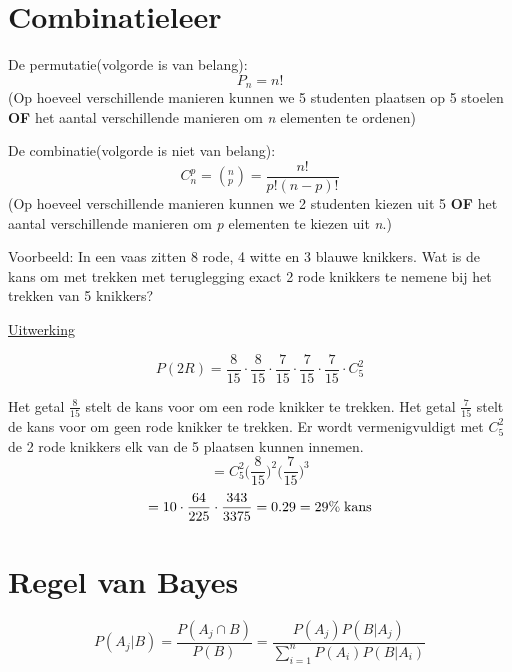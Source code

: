 \documentclass[12pt]{report}
\newcommand{\example}[2]{
      \hrulefill
      
      Voorbeeld: #1
      
      \underline{Uitwerking}
      
      #2
      
      \hrulefill
  }
\begin{document}
\section{Combinatieleer}
De permutatie(volgorde is van belang): $$P_n = n!$$ (Op hoeveel verschillende manieren kunnen we 5 studenten plaatsen op 5 stoelen \textbf{OF} het aantal verschillende manieren om \textit{n} elementen te ordenen)


De combinatie(volgorde is niet van belang): $$C_n^p = (_p^n) = \frac{n!}{p!(n - p)!}$$ (Op hoeveel verschillende manieren kunnen we 2 studenten kiezen uit 5 \textbf{OF} het aantal verschillende manieren om \textit{p} elementen te kiezen uit \textit{n}.)

\example{In een vaas zitten 8 rode, 4 witte en 3 blauwe knikkers. Wat is de kans om met trekken met teruglegging exact 2 rode knikkers te nemene bij het trekken van 5 knikkers?}{
	$$P(2R) = \frac{8}{15} \cdot \frac{8}{15} \cdot \frac{7}{15} \cdot \frac{7}{15} \cdot \frac{7}{15} \cdot C_5^2$$
	
	Het getal $\frac{8}{15}$ stelt de kans voor om een rode knikker te trekken. Het getal $\frac{7}{15}$ stelt de kans voor om geen rode knikker te trekken. Er wordt vermenigvuldigt met $C_5^2$ de 2 rode knikkers elk van de 5 plaatsen kunnen innemen.
	$$=C_5^2 \bigg(\frac{8}{15}\bigg)^2\bigg(\frac{7}{15}\bigg)^3$$
	$$= 10 \cdot \frac{64}{225} \cdot \frac{343}{3375} = 0.29 = 29\%\; \hbox{kans}$$
	
}

\section{Regel van Bayes}
$$P(A_j|B) = \frac{P(A_j \cap B)}{P(B)} = \frac{P(A_j)P(B|A_j)}{\sum_{i = 1}^{n}P(A_i)P(B|A_i)}$$
\end{document}
